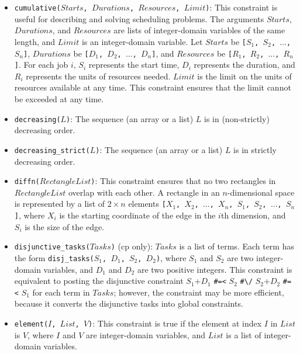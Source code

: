 \begin{itemize}
\item \texttt{cumulative($Starts$, $Durations$, $Resources$, $Limit$)}: This constraint is useful for describing and solving scheduling problems. The arguments $Starts$, $Durations$, and $Resources$ are lists of integer-domain variables of the same length, and $Limit$ is an integer-domain variable. Let $Starts$ be \texttt{[$S_1$, $S_2$, $\ldots$, $S_n$]}, $Durations$ be \texttt{[$D_1$, $D_2$, $\ldots$, $D_n$]}, and $Resources$ be \texttt{[$R_1$, $R_2$, $\ldots$, $R_n$]}. For each job \texttt{$i$}, \texttt{$S_i$} represents the start time, \texttt{$D_i$} represents the duration, and \texttt{$R_i$} represents the units of resources needed. $Limit$ is the limit on the units of resources available at any time. This constraint ensures that the limit cannot be exceeded at any time.

\item \texttt{decreasing($L$)}: The sequence (an array or a list) $L$ is in (non-strictly) decreasing order.

\item \texttt{decreasing\_strict($L$)}: The sequence (an array or a list) $L$ is in strictly decreasing order.

\item \texttt{diffn($RectangleList$)}: This constraint ensures that no two rectangles in $RectangleList$ overlap with each other. A rectangle in an $n$-dimensional space is represented by a list of $2\times n$ elements \texttt{[$X_1$, $X_2$, $\ldots$, $X_n$, $S_1$, $S_2$, $\ldots$, $S_n$]}, where \texttt{$X_i$} is the starting coordinate of the edge in the $i$th dimension, and \texttt{$S_i$} is the size of the edge.

\item \texttt{disjunctive\_tasks($Tasks$)} (cp only): $Tasks$ is a list of terms.  Each term has the form \texttt{disj\_tasks($S_1$, $D_1$, $S_2$, $D_2$)}, where \texttt{$S_1$} and \texttt{$S_2$} are two integer-domain variables, and \texttt{$D_1$} and \texttt{$D_2$} are two positive integers. This constraint is equivalent to posting the disjunctive constraint $S_1$+$D_1$ \verb+#=<+ $S_2$ \verb+#\/+ $S_2$+$D_2$ \verb+#=<+ $S_1$ for each term in $Tasks$; however, the constraint may be more efficient, because it converts the disjunctive tasks into global constraints. 

\item \texttt{element($I$, $List$, $V$)}: This constraint is true if the element at index $I$ in $List$ is $V$, where $I$ and $V$ are integer-domain variables, and $List$ is a list of integer-domain variables.


\end{itemize}

